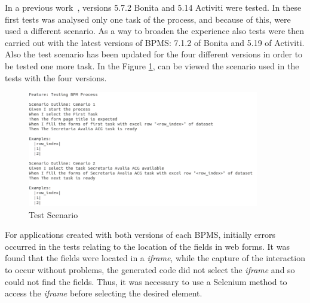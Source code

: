 \documentclass[runningheads,a4paper]{llncs}
\begin{document}



In a previous work~\cite{sbqs2015}, versions 5.7.2 Bonita and 5.14 Activiti were tested. In these first tests was analysed only one task of the process, and because of this, were used a different scenario. As a way to broaden the experience also tests were then carried out with the latest versions of BPMS: 7.1.2 of Bonita and 5.19 of Activiti. Also the test scenario has been updated for the four different versions in order to be tested one more task. In the Figure \ref{fig:cenario2}, can be viewed the scenario used in the tests with the four versions.

\begin{figure}[ht]
\centering
\includegraphics[width=0.9\textwidth]{figuras/cenario2.png}
\caption{Test Scenario}
\label{fig:cenario2}
\end{figure}


For applications created with both versions of each BPMS, initially errors occurred in the tests relating to the location of the fields in web forms. It was found that the fields were located in a \emph{iframe}, while the capture of the interaction to occur without problems, the generated code did not select the \emph{iframe} and so could not find the fields. Thus, it was necessary to use a Selenium method to access the \emph{iframe} before selecting the desired element.
\end{document}

